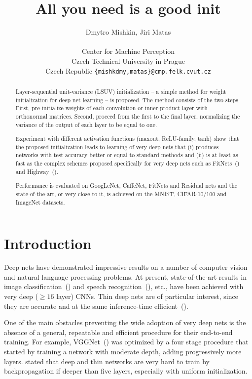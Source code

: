 \documentclass{article} \clearpage{}\usepackage{iclr2016_conference,times}
\title{All you need is a good init}
\author{Dmytro Mishkin, Jiri Matas  \\
\\
Center for Machine Perception\\
 Czech Technical University in Prague\\
 Czech Republic
\texttt{\{mishkdmy,matas\}@cmp.felk.cvut.cz} \\
}
\begin{document}
\maketitle
\begin{abstract}
Layer-sequential unit-variance (LSUV) initialization --  a simple method for weight initialization for deep net learning -- is proposed. The method consists of the two steps. First, pre-initialize weights of each convolution or inner-product layer with orthonormal matrices. Second, proceed from the first to the final layer, normalizing the variance of the output of each layer to be equal to one.

Experiment with different activation functions (maxout, ReLU-family, tanh) show that the proposed initialization leads to learning of very deep nets that (i) produces networks with test accuracy better or equal to standard methods and (ii) is at least as fast as the complex schemes proposed specifically for very deep nets such as FitNets~(\cite{FitNets2014}) and Highway~(\cite{Highway2015}). 

Performance is evaluated on GoogLeNet, CaffeNet, FitNets and Residual nets and the state-of-the-art, or very close to it, is achieved on the MNIST, CIFAR-10/100 and ImageNet datasets.
\end{abstract}

\section{Introduction}
\label{intro}
Deep nets have demonstrated impressive results on a number of computer vision and natural language processing problems. 
At present, state-of-the-art results in image classification~(\cite{VGGNet2015,Googlenet2015}) and speech recognition~(\cite{VGGNetSound2015}), etc., have been achieved with very deep ($\geq 16$ layer) CNNs.
Thin deep nets are of particular interest, since they are accurate and at the same inference-time efficient~(\cite{FitNets2014}).

One of the main obstacles preventing the wide adoption of very deep nets is the absence of a general, repeatable and efficient procedure for their end-to-end training. 
For example, VGGNet~(\cite{VGGNet2015}) was optimized by a four stage procedure that started by training a network with moderate depth, adding progressively more layers.
\cite{FitNets2014} stated that deep and thin networks are very hard to train by backpropagation if deeper than five layers, especially with uniform initialization.
\end{document}
